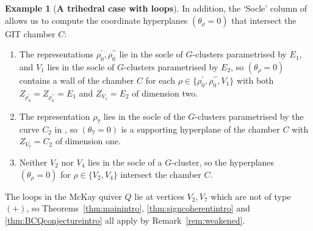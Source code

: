 \documentclass[11pt,reqno]{amsart}
\numberwithin{equation}{section}
\theoremstyle{definition}
\newtheorem{example}[theorem]{Example}
\newcommand{\0}{\operatorname{0}}
\begin{document}
\begin{example}[\textbf{A trihedral case with loops}]
 In addition, the `Socle' column of \cite[Table~10]{NolladeCelis21} allows us to compute the coordinate hyperplanes $(\theta_\rho=0)$ that intersect the GIT chamber $C$:
 \begin{enumerate}
     \item[\ensuremath{(+)}] The representations $\rho_{0}^\prime, \rho_{0}^{\prime\prime}$ lie in the socle of $G$-clusters parametrised by $E_1$, and $V_{1}$ lies in the socle of $G$-clusters parametrised by $E_2$, so $(\theta_\rho=0)$ contains a wall of the chamber $C$ for each $\rho\in \{\rho_{0}^\prime, \rho_{0}^{\prime\prime}, V_1\}$ with both $Z_{\rho_0^\prime}=Z_{\rho_0^{\prime\prime}}=E_1$ and $Z_{V_1}=E_2$ of dimension two. 
     \item[\ensuremath{(0)}] The representation $\rho_{7}$ lies in the socle of the $G$-clusters parametrised by the curve $C_2$ in \cite[Figure~9]{NolladeCelis21}, so $(\theta_7=0)$ is a supporting hyperplane of the chamber $C$ with $Z_{V_7}=C_2$ of dimension one. 
     \item[\ensuremath{(-)}] Neither $V_2$ nor $V_4$ lies in the socle of a $G$-cluster, so the hyperplanes $(\theta_\rho=0)$ for $\rho\in \{V_2, V_4\}$ intersect the chamber $C$. 
 \end{enumerate}
 The loops in the McKay quiver $Q$ lie at vertices $V_2, V_7$ which are not of type \ensuremath{(+)}, so Theorems~\ref{thm:mainintro}, \ref{thm:signcoherentintro} and \ref{thm:BCQconjectureintro} all apply by Remark~\ref{rem:weakened}.
 

\end{example}
\end{document}
